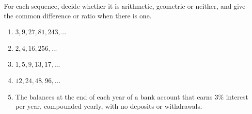 For each sequence, decide whether it is arithmetic, geometric or neither, and give the common difference or ratio when there is one.
\begin{enumerate}
\item $3,9,27,81,243,\dots$
\item $2,4,16,256,\dots$
\item $1,5,9,13,17,\dots$
\item $12,24,48,96,\dots$
\item The balances at the end of each year of a bank account that earns $3\%$ interest per year, compounded yearly, with no deposits or withdrawals.
\end{enumerate}
